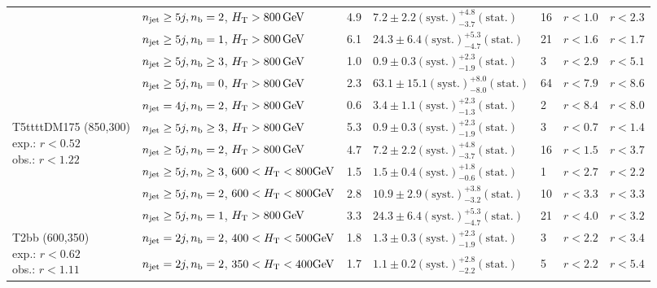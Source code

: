 \begin{table}[h!]
\begin{tabular}{ lllllll }
 & $n_{\mathrm{jet}} \geq5j,n_{\text{b}} =2$, $\mbox{$H_\text{T}$} > 800 \, \mathrm{GeV}$ & 4.9 & $7.2 \pm 2.2 \mathrm{(syst.)} ^{+4.8}_{-3.7} \mathrm{(stat.)}$ & 16 & $r < 1.0$ & $r < 2.3$\\ 
 & $n_{\mathrm{jet}} \geq5j,n_{\text{b}} =1$, $\mbox{$H_\text{T}$} > 800 \, \mathrm{GeV}$ & 6.1 & $24.3 \pm 6.4 \mathrm{(syst.)} ^{+5.3}_{-4.7} \mathrm{(stat.)}$ & 21 & $r < 1.6$ & $r < 1.7$\\ 
 & $n_{\mathrm{jet}} \geq5j,n_{\text{b}} \geq3$, $\mbox{$H_\text{T}$} > 800 \, \mathrm{GeV}$ & 1.0 & $0.9 \pm 0.3 \mathrm{(syst.)} ^{+2.3}_{-1.9} \mathrm{(stat.)}$ & 3 & $r < 2.9$ & $r < 5.1$\\ 
 & $n_{\mathrm{jet}} \geq5j,n_{\text{b}} =0$, $\mbox{$H_\text{T}$} > 800 \, \mathrm{GeV}$ & 2.3 & $63.1 \pm 15.1 \mathrm{(syst.)} ^{+8.0}_{-8.0} \mathrm{(stat.)}$ & 64 & $r < 7.9$ & $r < 8.6$\\ 
 & $n_{\mathrm{jet}} =4j,n_{\text{b}} =2$, $\mbox{$H_\text{T}$} > 800 \, \mathrm{GeV}$ & 0.6 & $3.4 \pm 1.1 \mathrm{(syst.)} ^{+2.3}_{-1.3} \mathrm{(stat.)}$ & 2 & $r < 8.4$ & $r < 8.0$\\ \hline
\multirow{5}{*}{\parbox[t]{2cm}{T5ttttDM175 (850,300)\\exp.: $r<0.52$\\obs.: $r<1.22$}}
 & $n_{\mathrm{jet}} \geq5j,n_{\text{b}} \geq3$, $\mbox{$H_\text{T}$} > 800 \, \mathrm{GeV}$ & 5.3 & $0.9 \pm 0.3 \mathrm{(syst.)} ^{+2.3}_{-1.9} \mathrm{(stat.)}$ & 3 & $r < 0.7$ & $r < 1.4$\\ 
 & $n_{\mathrm{jet}} \geq5j,n_{\text{b}} =2$, $\mbox{$H_\text{T}$} > 800 \, \mathrm{GeV}$ & 4.7 & $7.2 \pm 2.2 \mathrm{(syst.)} ^{+4.8}_{-3.7} \mathrm{(stat.)}$ & 16 & $r < 1.5$ & $r < 3.7$\\ 
 & $n_{\mathrm{jet}} \geq5j,n_{\text{b}} \geq3$, $600 < \mbox{$H_\text{T}$} < 800 \mathrm{GeV}$ & 1.5 & $1.5 \pm 0.4 \mathrm{(syst.)} ^{+1.8}_{-0.6} \mathrm{(stat.)}$ & 1 & $r < 2.7$ & $r < 2.2$\\ 
 & $n_{\mathrm{jet}} \geq5j,n_{\text{b}} =2$, $600 < \mbox{$H_\text{T}$} < 800 \mathrm{GeV}$ & 2.8 & $10.9 \pm 2.9 \mathrm{(syst.)} ^{+3.8}_{-3.2} \mathrm{(stat.)}$ & 10 & $r < 3.3$ & $r < 3.3$\\ 
 & $n_{\mathrm{jet}} \geq5j,n_{\text{b}} =1$, $\mbox{$H_\text{T}$} > 800 \, \mathrm{GeV}$ & 3.3 & $24.3 \pm 6.4 \mathrm{(syst.)} ^{+5.3}_{-4.7} \mathrm{(stat.)}$ & 21 & $r < 4.0$ & $r < 3.2$\\ \hline
\multirow{5}{*}{\parbox[t]{2cm}{T2bb (600,350)\\exp.: $r<0.62$\\obs.: $r<1.11$}}
 & $n_{\mathrm{jet}} =2j,n_{\text{b}} =2$, $400 < \mbox{$H_\text{T}$} < 500 \mathrm{GeV}$ & 1.8 & $1.3 \pm 0.3 \mathrm{(syst.)} ^{+2.3}_{-1.9} \mathrm{(stat.)}$ & 3 & $r < 2.2$ & $r < 3.4$\\ 
 & $n_{\mathrm{jet}} =2j,n_{\text{b}} =2$, $350 < \mbox{$H_\text{T}$} < 400 \mathrm{GeV}$ & 1.7 & $1.1 \pm 0.2 \mathrm{(syst.)} ^{+2.8}_{-2.2} \mathrm{(stat.)}$ & 5 & $r < 2.2$ & $r < 5.4$\\ 

\end{tabular}
\end{table}
